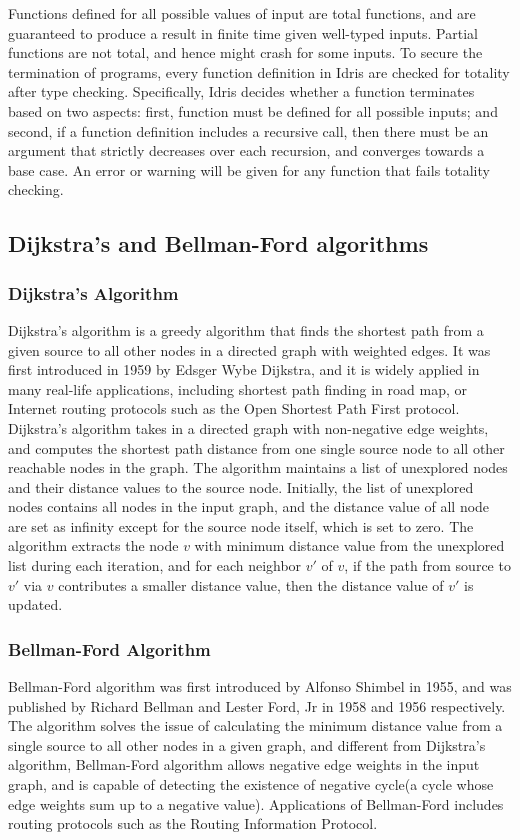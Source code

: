 Functions defined for all possible values of input are total functions, and are guaranteed to produce a result in finite time given well-typed inputs. Partial functions are not total, and hence might crash for some inputs. To secure the termination of programs, every function definition in Idris are checked for totality after type checking. Specifically, Idris decides whether a function terminates based on two aspects: first, function must be defined for all possible inputs; and second, if a function definition includes a recursive call, then there must be an argument that strictly decreases over each recursion, and converges towards a base case. An error or warning will be given for any function that fails totality checking. 

\subsection{Dijkstra's and Bellman-Ford algorithms}
\subsubsection*{Dijkstra's Algorithm}
Dijkstra's algorithm is a greedy algorithm that finds the shortest path from a given source to all other nodes in a directed graph with weighted edges. It was first introduced in 1959 by Edsger Wybe Dijkstra, and it is widely applied in many real-life applications, including shortest path finding in road map, or Internet routing protocols such as the Open Shortest Path First protocol. 
\\

Dijkstra's algorithm takes in a directed graph with non-negative edge weights, and computes the shortest path distance from one single source node to all other reachable nodes in the graph. The algorithm maintains a list of unexplored nodes and their distance values to the source node. Initially, the list of unexplored nodes contains all nodes in the input graph, and the distance value of all node are set as infinity except for the source node itself, which is set to zero. The algorithm extracts the node $v$ with minimum distance value from the unexplored list during each iteration, and for each neighbor $v'$ of $v$, if the path from source to $v'$ via $v$ contributes a smaller distance value, then the distance value of $v'$ is updated. 

\subsubsection*{Bellman-Ford Algorithm}
Bellman-Ford algorithm was first introduced by Alfonso Shimbel in 1955, and was published by Richard Bellman and Lester Ford, Jr in 1958 and 1956 respectively. The algorithm solves the issue of calculating the minimum distance value from a single source to all other nodes in a given graph, and different from Dijkstra's algorithm, Bellman-Ford algorithm allows negative edge weights in the input graph, and is capable of detecting the existence of negative cycle(a cycle whose edge weights sum up to a negative value). Applications of Bellman-Ford includes routing protocols such as the Routing Information Protocol. 